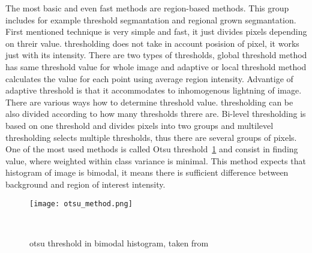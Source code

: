         The most basic and even fast methods are region-based methods. This group includes for example threshold segmantation and regional grown segmantation.
        First mentioned technique is very simple and fast, it just divides pixels depending on threir value. thresholding does not take in account posision of pixel,
        it works just with its intensity. There are two types of thresholds, global threshold method has same threshold value for whole image and adaptive or local
        threshold method calculates the value for each point using average region intensity. Advantige of adaptive threshold is that it accommodates to inhomogenous
        lightning of image. There are various ways how to determine threshold value. thresholding can be also divided according to how many thresholds threre are.
        Bi-level thresholding is based on one threshold and divides pixels into two groups and multilevel thresholding selects multiple thresholds, thus there are several groups of pixels.
        One of the most used methods is called Otsu threshold~\ref{fig:otsu} and consist in finding value, where weighted within class variance is minimal. This method expects that histogram of image
        is bimodal, it means there is sufficient difference between background and region of interest intensity. \cite{15, 16, 17, 18}
        
        \begin{figure}[h]
            \texttt{[image: otsu\_method.png]}
            \caption{otsu threshold in bimodal histogram, taken from~\cite{20}}~\label{fig:otsu}
        \end{figure}

